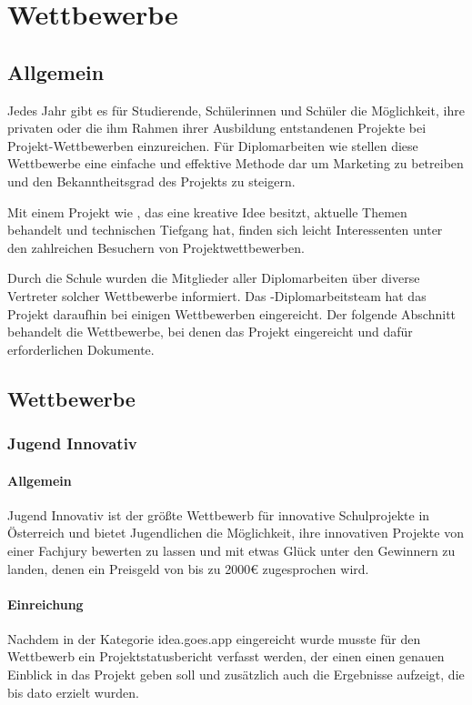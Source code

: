 \chapter{Wettbewerbe}
\renewcommand{\kapitelautor}{Autor: Andreas Novak}

\section{Allgemein}
Jedes Jahr gibt es für Studierende, Schülerinnen und Schüler die Möglichkeit, ihre privaten
oder die ihm Rahmen ihrer Ausbildung entstandenen Projekte bei Projekt-Wettbewerben
einzureichen. Für Diplomarbeiten wie \sblit stellen diese Wettbewerbe eine einfache und effektive
Methode dar um Marketing zu betreiben und den Bekanntheitsgrad des Projekts zu steigern.

Mit einem Projekt wie \sblit, das eine kreative Idee besitzt, aktuelle Themen behandelt und technischen Tiefgang hat,
finden sich leicht Interessenten unter den zahlreichen Besuchern von Projektwettbewerben.

Durch die Schule wurden die Mitglieder aller Diplomarbeiten über diverse Vertreter
solcher Wettbewerbe informiert. Das \sblit-Diplomarbeitsteam hat das Projekt daraufhin bei einigen
Wettbewerben eingereicht. Der folgende Abschnitt behandelt die Wettbewerbe, bei denen das Projekt
eingereicht und dafür erforderlichen Dokumente.

\section{Wettbewerbe}
\subsection{Jugend Innovativ}
\subsubsection{Allgemein}
Jugend Innovativ ist der größte Wettbewerb für innovative Schulprojekte in Österreich und
bietet Jugendlichen die Möglichkeit, ihre innovativen Projekte von einer Fachjury bewerten zu lassen
und mit etwas Glück unter den Gewinnern zu landen, denen ein Preisgeld von bis zu 2000€ zugesprochen wird.

\subsubsection{Einreichung}
Nachdem \sblit in der Kategorie idea.goes.app eingereicht  wurde musste für den Wettbewerb ein
Projektstatusbericht verfasst werden, der einen einen genauen Einblick in das Projekt geben soll
und zusätzlich auch die Ergebnisse aufzeigt, die bis dato erzielt wurden.

